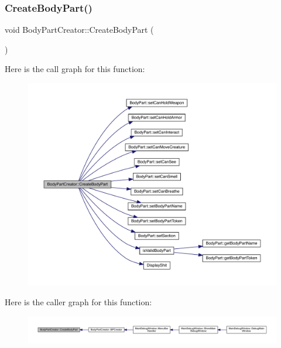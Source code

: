 \subsubsection{\texorpdfstring{Create\+Body\+Part()}{CreateBodyPart()}}
{\footnotesize\ttfamily void Body\+Part\+Creator\+::\+Create\+Body\+Part (\begin{DoxyParamCaption}{ }\end{DoxyParamCaption})}

Here is the call graph for this function\+:
\nopagebreak
\begin{figure}[H]
\begin{center}
\leavevmode
\includegraphics[width=350pt]{d8/d3a/namespace_body_part_creator_a1e5297a1d1c20d2867434868cfc42ac1_cgraph}
\end{center}
\end{figure}
Here is the caller graph for this function\+:
\nopagebreak
\begin{figure}[H]
\begin{center}
\leavevmode
\includegraphics[width=350pt]{d8/d3a/namespace_body_part_creator_a1e5297a1d1c20d2867434868cfc42ac1_icgraph}
\end{center}
\end{figure}
\mbox{\label{namespace_body_part_creator_af0715dc94164f78c721237555a28209c}} 
